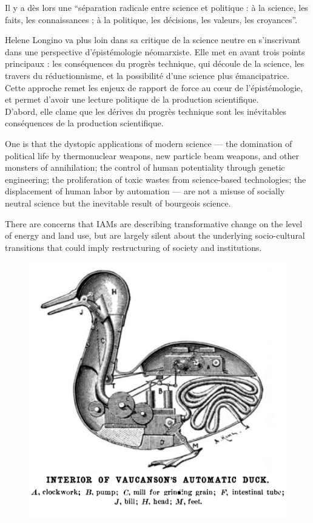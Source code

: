 Il y a dès lors une \enquote{séparation radicale entre science et politique : à la science, les faits, les connaissances ; à la politique, les décisions, les valeurs, les croyances}. 


Helene Longino va plus loin dans sa critique de la science neutre en s'inscrivant dans une perspective d'épistémologie néomarxiste. Elle met en avant trois points principaux : les conséquences du progrès technique, qui découle de la science, les travers du réductionnisme, et la possibilité d'une science plus émancipatrice. Cette approche remet les enjeux de rapport de force au cœur de l'épistémologie, et permet d'avoir une lecture politique de la production scientifique. \\

D'abord, elle clame que les dérives du progrès technique sont les inévitables conséquences de la production scientifique.

\begin{authoredquote}
    One is that the dystopic applications of modern science — the domination of political life by thermonuclear weapons, new particle beam weapons, and other monsters of annihilation; the control of human potentiality through genetic engineering; the proliferation of toxic wastes from science-based technologies; the displacement of human labor by automation — are not a misuse of socially neutral science but the inevitable result of bourgeois science.
\end{authoredquote}

\begin{authoredquote}
    There are concerns that IAMs are describing transformative change on the level of energy and land use, but are largely silent about the underlying socio-cultural transitions that could imply restructuring of society and institutions.
\end{authoredquote}


\begin{figure}
    \centering
    \includegraphics[width=0.6\linewidth]{reductionisme.png}
    \label{fig:reductionnisme}
\end{figure}



